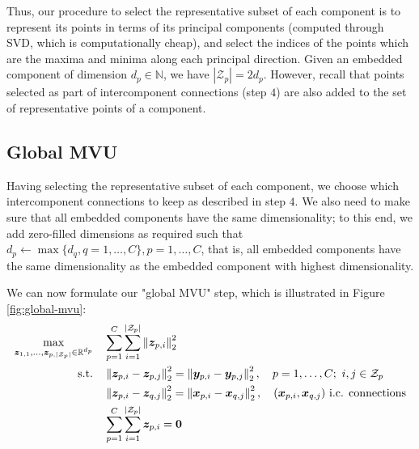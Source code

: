\documentclass{article} %
\newcommand{\norm}[1]{\left\lVert#1\right\rVert}
\begin{document}
Thus, our procedure to select the representative subset of each component is to represent its points in terms of its principal components (computed through SVD, which is computationally cheap), and select the indices of the points which are the maxima and minima along each principal direction. Given an embedded component of dimension $d_p\in\mathbb{N}$, we have $|\mathcal{Z}_p|=2d_p$. However, recall that points selected as part of intercomponent connections (step $4$) are also added to the set of representative points of a component.

\subsection{Global MVU} \label{sec:global-mvu}

Having selecting the representative subset of each component, we choose which intercomponent connections to keep as described in step $4$. We also need to make sure that all embedded components have the same dimensionality; to this end, we add zero-filled dimensions as required such that $d_p\leftarrow\max \{d_q, q=1,\dotsc,C\}, p=1,\dotsc,C$, that is, all embedded components have the same dimensionality as the embedded component with highest dimensionality.




We can now formulate our "global MVU" step, which is illustrated in Figure \ref{fig:global-mvu}:
\begin{align}
    \max_{\bm{z}_{1,1},\dotsc,\bm{z}_{p,|\mathcal{Z}_{p}|}\in\R^{d_p}} \quad& \sum_{p=1}^{C}\sum_{i=1}^{|\mathcal{Z}_p|} \norm{\bm{z}_{p,i}}_2^2\label{eq:global-mvu-obj}\\
    \textrm{s.t.} \quad& \norm{\bm{z}_{p,i}-\bm{z}_{p,j}}_{2}^{2}=\norm{\bm{y}_{p,i}-\bm{y}_{p,j}}_{2}^{2},\quad p=1,\dotsc,C; \ i,j\in\mathcal{Z}_{p}\label{eq:global-mvu-intra}\\
    \quad& \norm{\bm{z}_{p,i}-\bm{z}_{q,j}}_{2}^{2}=\norm{\bm{x}_{p,i}-\bm{x}_{q,j}}_{2}^{2},\quad (\bm{x}_{p,i},\bm{x}_{q,j})\text{ i.c. connections}\label{eq:global-mvu-inter}\\
    \quad& \sum_{p=1}^{C}\sum_{i=1}^{|\mathcal{Z}_p|}\bm{z}_{p,i}=\bm{0}\label{eq:global-mvu-zerocenter}
\end{align}
\end{document}

